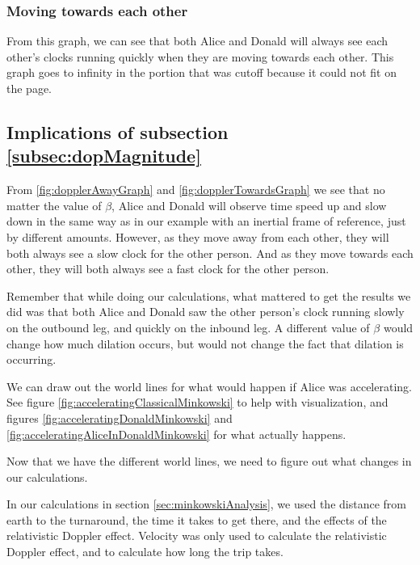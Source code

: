 		\subsubsection{Moving towards each other}
			
			From this graph, we can see that both Alice and Donald will always see each other's clocks running quickly when they are moving towards each other. This graph goes to infinity in the portion that was cutoff because it could not fit on the page.
	\subsection{Implications of subsection \ref{subsec:dopMagnitude}}
		From \ref{fig:dopplerAwayGraph} and \vref{fig:dopplerTowardsGraph} we see that no matter the value of $\beta$, Alice and Donald will observe time speed up and slow down in the same way as in our example with an inertial frame of reference, just by different amounts.
		However, as they move away from each other, they will both always see a slow clock for the other person.
		And as they move towards each other, they will both always see a fast clock for the other person.

		Remember that while doing our calculations, what mattered to get the results we did was that both Alice and Donald saw the other person's clock running slowly on the outbound leg, and quickly on the inbound leg. A different value of $\beta$ would change how much dilation occurs, but would not change the fact that dilation is occurring.

		We can draw out the world lines for what would happen if Alice was accelerating. See figure \vref{fig:acceleratingClassicalMinkowski} to help with visualization, and figures \ref{fig:acceleratingDonaldMinkowski} and \vref{fig:acceleratingAliceInDonaldMinkowski} for what actually happens.
		
		
		
		\newpage
		Now that we have the different world lines, we need to figure out what changes in our calculations.

		In our calculations in section \vref{sec:minkowskiAnalysis}, we used the distance from earth to the turnaround, the time it takes to get there, and the effects of the relativistic Doppler effect. Velocity was only used to calculate the relativistic Doppler effect, and to calculate how long the trip takes.

